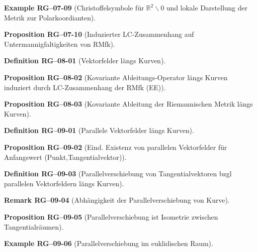 \documentclass[10pt, letterpaper]{article}
\newcommand{\R}{\mathbb{R}}
\newcommand{\CustomHeading}[3]{%
  \par\medskip\noindent%
  \textbf{#1 #2} \textnormal{(#3)}.\enskip%
}
\newenvironment{DEF}[2]{\CustomHeading{Definition}{#1}{#2}}{}
\newenvironment{PROP}[2]{\CustomHeading{Proposition}{#1}{#2}}{}
\newenvironment{REM}[2]{\CustomHeading{Remark}{#1}{#2}}{}
\newenvironment{EXA}[2]{\CustomHeading{Example}{#1}{#2}}{}
\begin{document}
\begin{EXA}{RG--07-09}{Christoffelsymbole für $\R^2\backslash 0$ und lokale Darstellung der Metrik zur Polarkoordianten}
\end{EXA}

\begin{PROP}{RG--07-10}{Induzierter LC-Zusammenhang auf Untermannigfaltigkeiten von RMfk}
\end{PROP}

\begin{DEF}{RG--08-01}{Vektorfelder längs Kurven}
\end{DEF}

\begin{PROP}{RG--08-02}{Kovariante Ableitungs-Operator längs Kurven induziert durch LC-Zusammenhang der RMfk (EE)}
\end{PROP}

\begin{PROP}{RG--08-03}{Kovariante Ableitung der Riemannischen Metrik längs Kurven}
\end{PROP}

\begin{DEF}{RG--09-01}{Parallele Vektorfelder längs Kurven}
\end{DEF}

\begin{PROP}{RG--09-02}{Eind. Existenz von parallelen Vektorfelder für Anfangswert (Punkt,Tangentialvektor)}
\end{PROP}

\begin{DEF}{RG--09-03}{Parallelverschiebung von Tangentialvektoren bzgl parallelen Vektorfeldern längs Kurven}
\end{DEF}

\begin{REM}{RG--09-04}{Abhängigkeit der Parallelverschiebung von Kurve}
\end{REM}

\begin{PROP}{RG--09-05}{Parallelverschiebung ist Isometrie zwischen Tangentialräumen}
\end{PROP}

\begin{EXA}{RG--09-06}{Parallelverschiebung im euklidischen Raum}
\end{EXA}
\end{document}
